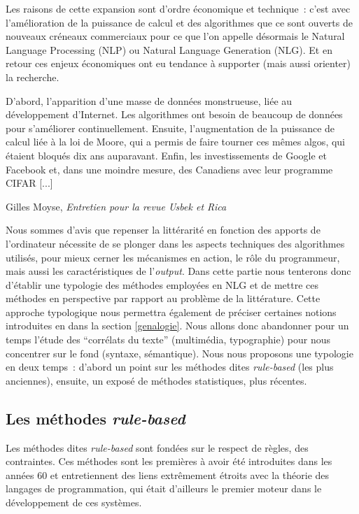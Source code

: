 \documentclass{article}
\newenvironment{citationbox}
{\begin{center}
		\begin{minipage}{.8\textwidth}
		}
		{
		\end{minipage}	
\end{center}
}
\begin{document}
		Les raisons de cette expansion sont d'ordre économique et technique~: c'est avec l'amélioration de la puissance de calcul et des algorithmes que ce sont ouverts de nouveaux créneaux commerciaux pour ce que l'on appelle désormais le Natural Language Processing (NLP) ou Natural Language Generation (NLG). Et en retour ces enjeux économiques ont eu tendance à supporter (mais aussi orienter) la recherche.\\
		\begin{citationbox}
			D’abord, l’apparition d’une masse de données monstrueuse, liée au développement d’Internet. Les algorithmes ont besoin de beaucoup de données pour s’améliorer continuellement. Ensuite, l’augmentation de la puissance de calcul liée à la loi de Moore, qui a permis de faire tourner ces mêmes algos, qui étaient bloqués dix ans auparavant. Enfin, les investissements de Google et Facebook et, dans une moindre mesure, des Canadiens avec leur programme CIFAR [...]
			\begin{flushright}
				Gilles Moyse, \textit{Entretien pour la revue Usbek et Rica} \cite{edin2018}
			\end{flushright}
		\end{citationbox}
		Nous sommes d'avis que repenser la littérarité en fonction des apports de l'ordinateur nécessite de se plonger dans les aspects techniques des algorithmes utilisés, pour mieux cerner les mécanismes en action, le rôle du programmeur, mais aussi les caractéristiques de l'\textit{output}. Dans cette partie nous tenterons donc d'établir une typologie des méthodes employées en NLG et de mettre ces méthodes en perspective par rapport au problème de la littérature. Cette approche typologique nous permettra également de préciser certaines notions introduites en dans la section \ref{genalogie}. Nous allons donc abandonner pour un temps l'étude des ``corrélats du texte'' (multimédia, typographie) pour nous concentrer sur le fond (syntaxe, sémantique). Nous nous proposons une typologie en deux temps~: d'abord un point sur les méthodes dites \textit{rule-based} (les plus anciennes), ensuite, un exposé de méthodes statistiques, plus récentes.
		
		\subsection{Les méthodes \textit{rule-based}}
			Les méthodes dites \textit{rule-based} sont fondées sur le respect de règles, des contraintes. Ces méthodes sont les premières à avoir été introduites dans les années 60 et entretiennent des liens extrêmement étroits avec la théorie des langages de programmation, qui était d'ailleurs le premier moteur dans le développement de ces systèmes.
\end{document}
